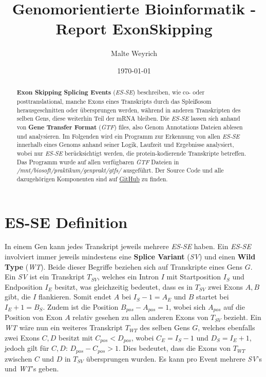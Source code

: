 \documentclass[12pt]{article}
\title{Genomorientierte Bioinformatik - Report ExonSkipping}
\author{
  Malte Weyrich
}
\date{\today}
\begin{document}
\maketitle
\begin{abstract}
	\textbf{Exon Skipping Splicing Events} (\textit{ES-SE}) beschreiben, wie co- oder posttranslational,
	manche Exons eines Transkripts durch das Splei\ss osom herausgeschnitten oder übersprungen werden, während
	in anderen Transkripten des selben Gens, diese weiterhin Teil der mRNA bleiben.
	Die \textit{ES-SE} lassen sich anhand von \textbf{Gene Transfer Format} (\textit{GTF}) files,
	also Genom Annotations Dateien ablesen und analysieren.
	Im Folgenden wird ein Programm zur Erkennung von allen \textit{ES-SE} innerhalb eines Genoms
	anhand seiner Logik, Laufzeit und Ergebnisse analysiert, wobei nur \textit{ES-SE} berücksichtigt werden,
	die protein-kodierende Transkripte betreffen. Das Programm wurde auf allen verfügbaren
	\textit{GTF} Dateien in \textit{/mnt/biosoft/praktikum/genprakt/gtfs/} ausgeführt.
	Der Source Code und alle dazugehörigen Komponenten sind auf \href{https://github.com/mweyrich28/exonSkipping}{GitHub} zu finden.
\end{abstract}

\newpage
\tableofcontents
\newpage



\section{ES-SE Definition}\label{sec:problem}
In einem Gen kann jedes Transkript jeweils mehrere \textit{ES-SE} haben.
Ein \textit{ES-SE} involviert immer jeweils mindestens eine \textbf{Splice Variant} (\textit{SV}) und einen
\textbf{Wild Type} (\textit{WT}). Beide dieser Begriffe beziehen sich auf Transkripte eines Gens $G$.
Ein \textit{SV} ist ein Transkript $T_{SV}$, welches ein Intron $I$ mit Startposition $I_{S}$ und Endposition
$I_{E}$ besitzt, was gleichzeitig bedeutet, dass es in $T_{SV}$ zwei Exons $A, B$ gibt, die $I$ flankieren. Somit endet $A$ bei $I_{S} - 1 = A_{E}$ und $B$ startet bei $I_{E} + 1 = B_{S}$.
Zudem ist die Position $B_{pos} - A_{pos} = 1$, wobei sich $A_{pos}$ auf die Position von Exon $A$ relativ gesehen
zu allen anderen Exons von $T_{SV}$ bezieht.
Ein \textit{WT} wäre nun ein weiteres Transkript $T_{WT}$ des selben Gens $G$, welches ebenfalls
zwei Exons $C, D$ besitzt mit $C_{pos} < D_{pos}$, wobei $C_{E} = I_{S} - 1$ und $D_{S} = I_{E} + 1$,
jedoch gilt für $C, D$: $D_{pos} - C_{pos} > 1$.
Dies bedeutet, dass die Exons von $T_{WT}$ zwischen $C$ und $D$ in $T_{SV}$ übersprungen wurden.
Es kann pro Event mehrere \textit{SV}'s und \textit{WT}'s geben.
\end{document}
